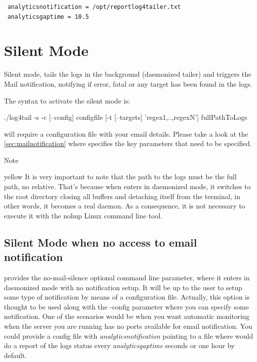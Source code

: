 \begin{config}
\begin{verbatim}
 analyticsnotification = /opt/reportlog4tailer.txt
 analyticsgaptime = 10.5
\end{verbatim}
\end{config}

\section{Silent Mode}
Silent mode, tails the logs in the background (daemonized tailer) and triggers
the Mail notification, notifying if error, fatal or any target has been found
in the logs. 

The syntax to activate the silent mode is:
\begin{cmd}
 ./log4tail -s -c [--config] configfile [-t [--targets] 'regex1,..,regexN'] fullPathToLogs
\end{cmd}

\logftailer{} will require a configuration file with your email details. Please
take a look at the \autoref{sec:mailnotification} where specifies the key
parameters that need to be specified. 

\begin {bclogo}[logo =\bcinfo, barre = none,noborder = true]{Note}
\begin {gbar}{yellow}
It is very important to note that the
path to the logs must be the full path, no relative. That's because when
\logftailer{} enters in daemonized mode, it switches to the root directory
closing all buffers and detaching itself from the terminal, in other words, it
becomes a real daemon. As a consequence, it is not necessary to execute it with
the nohup Linux command line tool.
\end{gbar}
\end{bclogo}

\subsection{Silent Mode when no access to email notification}
\logftailer{} provides the no-mail-silence optional command line parameter,
where it enters in daemonized mode with no notification setup. It will be up to
the user to setup some type of notification by means of a configuration file.
Actually, this option is thought to be used along with the -config parameter
where you can specify some notification. One of the scenarios would be when you
want automatic monitoring when the server you are running \logftailer{} has no
ports available for email notification. You could provide a config file with
\emph{analyticsnotification} pointing to a file where \logftailer{} would do a
report of the logs status every \emph{analyticsgaptime} seconds or one hour by
default.

